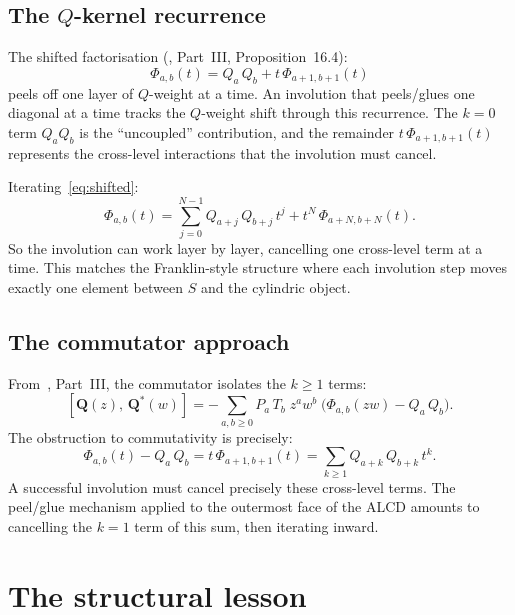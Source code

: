 \documentclass[11pt]{article}
\theoremstyle{plain}
\theoremstyle{definition}
\begin{document}
\subsection{The $Q$-kernel recurrence}

The shifted factorisation (\cite{ADJOINT}, Part~III,
Proposition~16.4):
\begin{equation}\label{eq:shifted}
  \Phi_{a,b}(t) = Q_a\, Q_b + t\, \Phi_{a+1,b+1}(t)
\end{equation}
peels off one layer of $Q$-weight at a time.  An involution that
peels/glues one diagonal at a time tracks the $Q$-weight shift
through this recurrence.  The $k = 0$ term $Q_a Q_b$ is the
``uncoupled'' contribution, and the remainder
$t\, \Phi_{a+1,b+1}(t)$ represents the cross-level interactions
that the involution must cancel.

Iterating~\eqref{eq:shifted}:
\begin{equation}\label{eq:shifted-iter}
  \Phi_{a,b}(t) = \sum_{j=0}^{N-1} Q_{a+j}\, Q_{b+j}\, t^j
    + t^N\, \Phi_{a+N,b+N}(t).
\end{equation}
So the involution can work layer by layer, cancelling one
cross-level term at a time.  This matches the Franklin-style
structure where each involution step moves exactly one element
between $S$ and the cylindric object.


\subsection{The commutator approach}

From~\cite{ADJOINT}, Part~III, the commutator isolates the
$k \geq 1$ terms:
\begin{equation}\label{eq:comm}
  [\mathbf{Q}(z),\, \mathbf{Q}^*(w)]
  = -\sum_{a,b \geq 0} P_a\, T_b\; z^a w^b\;
    \bigl(\Phi_{a,b}(zw) - Q_a\, Q_b\bigr).
\end{equation}
The obstruction to commutativity is precisely:
\begin{equation}\label{eq:obstruction}
  \Phi_{a,b}(t) - Q_a\, Q_b
  = t\, \Phi_{a+1,b+1}(t)
  = \sum_{k \geq 1} Q_{a+k}\, Q_{b+k}\, t^k.
\end{equation}
A successful involution must cancel precisely these cross-level
terms.  The peel/glue mechanism applied to the outermost face of
the ALCD amounts to cancelling the $k = 1$ term of this sum,
then iterating inward.


\section{The structural lesson}
\label{sec:lesson}
\end{document}
